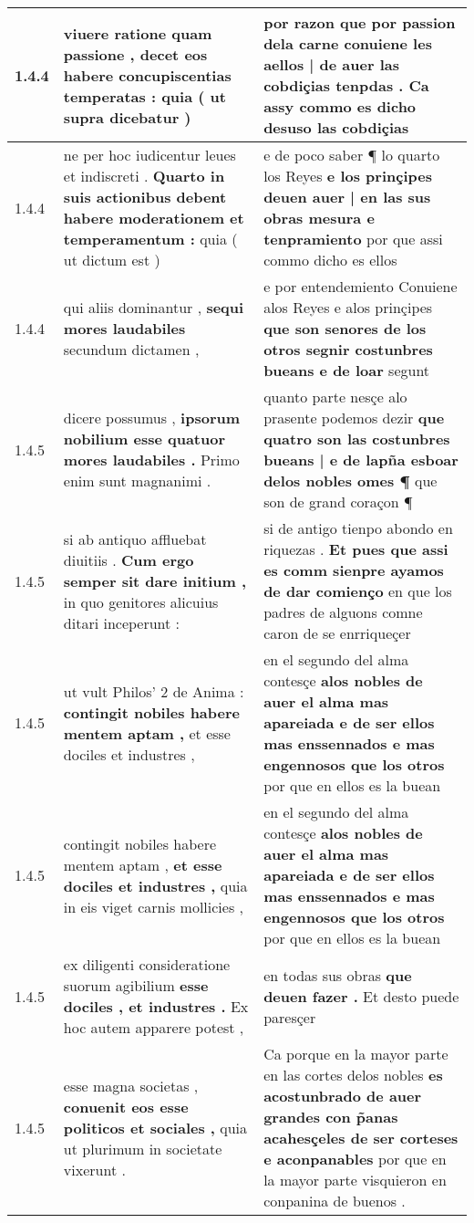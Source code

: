 \begin{tabular}{|p{1cm}|p{6.5cm}|p{6.5cm}|}
1.4.4 & viuere ratione quam passione , \textbf{ decet eos habere concupiscentias temperatas : } quia ( ut supra dicebatur ) & por razon que por passion dela carne \textbf{ conuiene les aellos | de auer las cobdiçias tenpdas . } Ca assy commo es dicho desuso las cobdiçias \\\hline
1.4.4 & ne per hoc iudicentur leues et indiscreti . \textbf{ Quarto in suis actionibus debent habere moderationem et temperamentum : } quia ( ut dictum est ) & e de poco saber ¶ lo quarto los Reyes \textbf{ e los prinçipes deuen auer | en las sus obras mesura e tenpramiento } por que assi commo dicho es ellos \\\hline
1.4.4 & qui aliis dominantur , \textbf{ sequi mores laudabiles } secundum dictamen , & e por entendemiento Conuiene alos Reyes e alos prinçipes \textbf{ que son senores de los otros segnir costunbres bueans e de loar } segunt \\\hline
1.4.5 & dicere possumus , \textbf{ ipsorum nobilium esse quatuor mores laudabiles . } Primo enim sunt magnanimi . & quanto parte nesçe alo prasente podemos dezir \textbf{ que quatro son las costunbres bueans | e de lapña esboar delos nobles omes ¶ } que son de grand coraçon ¶ \\\hline
1.4.5 & si ab antiquo affluebat diuitiis . \textbf{ Cum ergo semper sit dare initium , } in quo genitores alicuius ditari inceperunt : & si de antigo tienpo abondo en riquezas . \textbf{ Et pues que assi es comm sienpre ayamos de dar comienço } en que los padres de alguons comne caron de se enrriqueçer \\\hline
1.4.5 & ut vult Philos’ 2 de Anima : \textbf{ contingit nobiles habere mentem aptam , } et esse dociles et industres , & en el segundo del alma contesçe \textbf{ alos nobles de auer el alma mas apareiada e de ser ellos mas enssennados e mas engennosos que los otros } por que en ellos es la buean \\\hline
1.4.5 & contingit nobiles habere mentem aptam , \textbf{ et esse dociles et industres , } quia in eis viget carnis mollicies , & en el segundo del alma contesçe \textbf{ alos nobles de auer el alma mas apareiada e de ser ellos mas enssennados e mas engennosos que los otros } por que en ellos es la buean \\\hline
1.4.5 & ex diligenti consideratione suorum agibilium \textbf{ esse dociles , et industres . } Ex hoc autem apparere potest , & en todas sus obras \textbf{ que deuen fazer . } Et desto puede paresçer \\\hline
1.4.5 & esse magna societas , \textbf{ conuenit eos esse politicos et sociales , } quia ut plurimum in societate vixerunt . & Ca porque en la mayor parte en las cortes delos nobles \textbf{ es acostunbrado de auer grandes con p̃anas acahesçeles de ser corteses e aconpanables } por que en la mayor parte visquieron en conpanina de buenos . \\\hline

\end{tabular}
